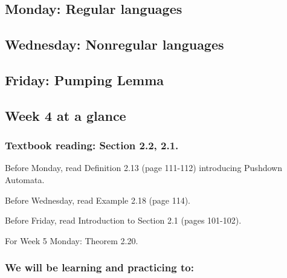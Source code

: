 \subsection*{Monday: Regular languages}



\newpage
\subsection*{Wednesday: Nonregular languages}



\newpage
\subsection*{Friday: Pumping Lemma}



\newpage

\subsection*{Week 4 at a glance}


\subsubsection*{Textbook reading: Section 2.2, 2.1.}

\vspace{-15pt}

Before Monday, read Definition 2.13 (page 111-112) introducing Pushdown Automata.

Before Wednesday, read Example 2.18 (page 114).

Before Friday, read Introduction to Section 2.1 (pages 101-102).

For Week 5 Monday: Theorem  2.20.

\vspace{-20pt}

\subsubsection*{We will be learning and practicing to:}


